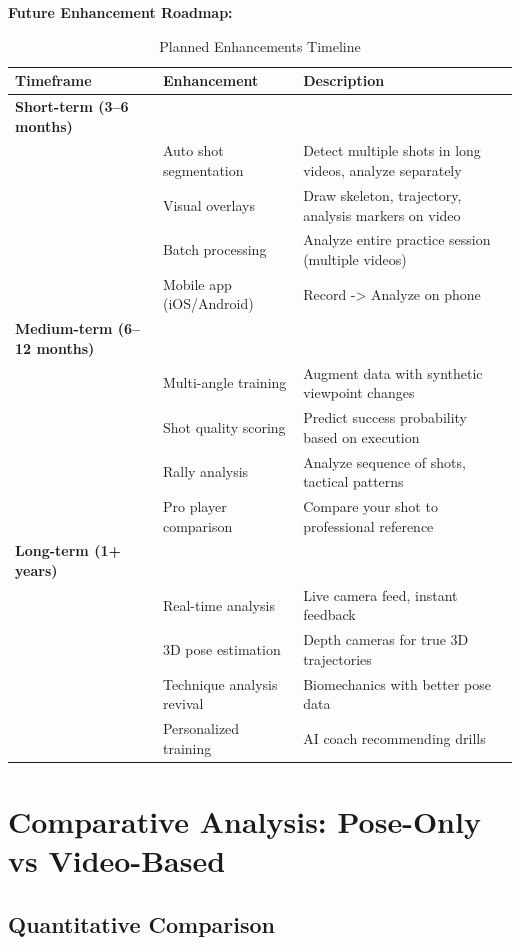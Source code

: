 \documentclass[11pt,a4paper]{article}
\begin{document}
\textbf{Future Enhancement Roadmap:}

\begin{table}[H]
\centering
\caption{Planned Enhancements Timeline}
\begin{tabular}{llp{6cm}}
\toprule
Timeframe & Enhancement & Description \\
\midrule
\textbf{Short-term (3--6 months)} & & \\
& Auto shot segmentation & Detect multiple shots in long videos, analyze separately \\
& Visual overlays & Draw skeleton, trajectory, analysis markers on video \\
& Batch processing & Analyze entire practice session (multiple videos) \\
& Mobile app (iOS/Android) & Record -> Analyze on phone \\
\midrule
\textbf{Medium-term (6--12 months)} & & \\
& Multi-angle training & Augment data with synthetic viewpoint changes \\
& Shot quality scoring & Predict success probability based on execution \\
& Rally analysis & Analyze sequence of shots, tactical patterns \\
& Pro player comparison & Compare your shot to professional reference \\
\midrule
\textbf{Long-term (1+ years)} & & \\
& Real-time analysis & Live camera feed, instant feedback \\
& 3D pose estimation & Depth cameras for true 3D trajectories \\
& Technique analysis revival & Biomechanics with better pose data \\
& Personalized training & AI coach recommending drills \\
\bottomrule
\end{tabular}
\end{table}

\section{Comparative Analysis: Pose-Only vs Video-Based}

\subsection{Quantitative Comparison}
\end{document}
